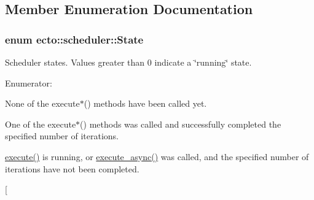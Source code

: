 \subsection{\-Member \-Enumeration \-Documentation}
\hypertarget{classecto_1_1scheduler_a6b063d1c4bb9dad58d7ace61946b1200}{
\subsubsection[{\-State}]{\setlength{\rightskip}{0pt plus 5cm}enum {\bf ecto\-::scheduler\-::\-State}}}\label{classecto_1_1scheduler_a6b063d1c4bb9dad58d7ace61946b1200}
\-Scheduler states. \-Values greater than 0 indicate a \char`\"{}running\char`\"{} state. \begin{Desc}
\item[\-Enumerator\-: ]\par
\begin{description}
\item[{\em 
\hypertarget{classecto_1_1scheduler_a6b063d1c4bb9dad58d7ace61946b1200a347092c6b9c4bbc7084bfa04d9ffb57f}{\-I\-N\-I\-T}\label{classecto_1_1scheduler_a6b063d1c4bb9dad58d7ace61946b1200a347092c6b9c4bbc7084bfa04d9ffb57f}
}]\-None of the execute$\ast$() methods have been called yet. \item[{\em 
\hypertarget{classecto_1_1scheduler_a6b063d1c4bb9dad58d7ace61946b1200aef190614c39d85b915b9ff2225eacf02}{\-R\-U\-N\-N\-I\-N\-G}\label{classecto_1_1scheduler_a6b063d1c4bb9dad58d7ace61946b1200aef190614c39d85b915b9ff2225eacf02}
}]\-One of the execute$\ast$() methods was called and successfully completed the specified number of iterations. \item[{\em 
\hypertarget{classecto_1_1scheduler_a6b063d1c4bb9dad58d7ace61946b1200a3e140c949a41686e2e0481d13e89c010}{\-E\-X\-E\-C\-U\-T\-I\-N\-G}\label{classecto_1_1scheduler_a6b063d1c4bb9dad58d7ace61946b1200a3e140c949a41686e2e0481d13e89c010}
}]\hyperlink{classecto_1_1scheduler_ad917e3fa322f0a065e306afec7284d4e}{execute()} is running, or \hyperlink{classecto_1_1scheduler_a2e9982c19e57c9e578d2f8f54c24dc1a}{execute\-\_\-async()} was called, and the specified number of iterations have not been completed. \item[{\em 
}
\end{description}
\end{Desc}
